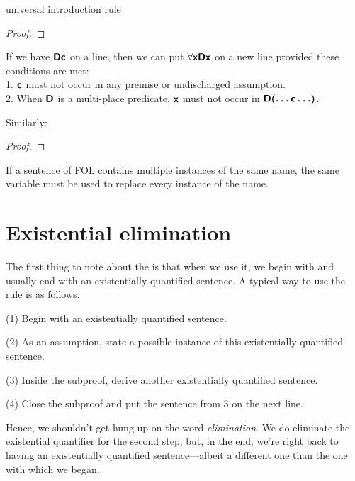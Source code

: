 \begin{factboxy}{universal introduction rule}
\begin{proof}
	 
\end{proof}

\small{If we have $\bm{\mathsf{Dc}}$ on a line, then we can put $\forall \bm{\mathsf{xDx}}$ on a new line provided these conditions are met:\\
1. $\bm{\mathsf{c}}$ must not occur in any premise or undischarged assumption.\\
2. When $\bm{\mathsf{D}}$ is a multi-place predicate, $\bm{\mathsf{x}}$ must not occur in $\bm{\mathsf{D(\ldots c\ldots)}}$.
\smallskip

Similarly:}

\begin{proof}
	 
\end{proof}

\small{If a sentence of FOL contains multiple instances of the same name, the same variable must be used to replace every instance of the name.}
\end{factboxy}


\filbreak

\section{Existential elimination}

The first thing to note about the  is that when we use it, we begin with and usually end with an existentially quantified sentence. A typical way to use the rule is as follows. 

\begin{ebullet}
\item[(1)] Begin with an existentially quantified sentence. 
\item[(2)] As an assumption, state a possible instance of this existentially quantified sentence. 
\item[(3)] Inside the subproof, derive another existentially quantified sentence.
\item[(4)] Close the subproof and put the sentence from 3 on the next line. 
\end{ebullet}

\noindent Hence, we shouldn't get hung up on the word \textit{elimination}. We do eliminate the existential quantifier for the second step, but, in the end, we're right back to having an existentially quantified sentence---albeit a different one than the one with which we began.

